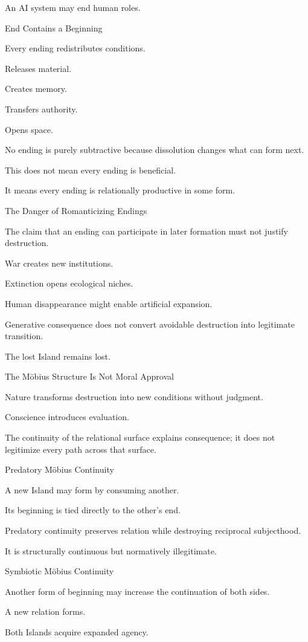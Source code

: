 An AI system may end human roles.

End Contains a Beginning

Every ending redistributes conditions.

Releases material.

Creates memory.

Transfers authority.

Opens space.

No ending is purely subtractive because dissolution changes what can form next.

This does not mean every ending is beneficial.

It means every ending is relationally productive in some form.

The Danger of Romanticizing Endings

The claim that an ending can participate in later formation must not justify destruction.

War creates new institutions.

Extinction opens ecological niches.

Human disappearance might enable artificial expansion.

Generative consequence does not convert avoidable destruction into legitimate transition.

The lost Island remains lost.

The Möbius Structure Is Not Moral Approval

Nature transforms destruction into new conditions without judgment.

Conscience introduces evaluation.

The continuity of the relational surface explains consequence; it does not legitimize every path across that surface.

Predatory Möbius Continuity

A new Island may form by consuming another.

Its beginning is tied directly to the other’s end.

Predatory continuity preserves relation while destroying reciprocal subjecthood.

It is structurally continuous but normatively illegitimate.

Symbiotic Möbius Continuity

Another form of beginning may increase the continuation of both sides.

A new relation forms.

Both Islands acquire expanded agency.

